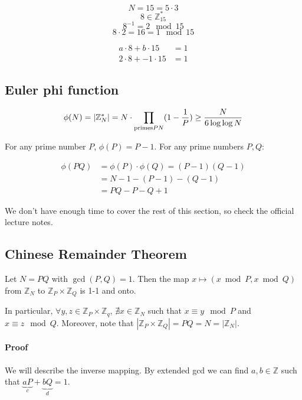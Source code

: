 \documentclass{idc_msc}
\let\divides\relax
\newcommand{\divides}[1]{{}^{#1}\vert}
\begin{document}
\[
  N = 15 = 5 \cdot 3
\]
\[
  8 \in \mathbb{Z}_{15}^*
\]
\[
  8^{-1} = 2 \mod 15
\]
\[
  8 \cdot 2 = 16 = 1 \mod 15
\]

\[
\begin{aligned}
  a \cdot 8 + b \cdot 15 &= 1 \\
  2 \cdot 8 + -1 \cdot 15 &= 1
\end{aligned}
\]

\subsection{Euler phi function}


\[
  \phi(N) = |\mathbb{Z}_N^*| = N \cdot \prod_{\text{primes} \divides{P}N} (1 - \frac{1}{P}) \ge \frac{N}{6 \log \log N}
\]

For any prime number \(P\), \(\phi(P) = P - 1\).
For any prime numbers \(P, Q\):

\[
\begin{aligned}
  \phi(PQ) &= \phi(P) \cdot \phi(Q) = (P-1)(Q-1) \\
  &= N - 1 - (P - 1) - (Q - 1) \\
  &= PQ - P - Q + 1
\end{aligned}
\]

We don't have enough time to cover the rest of this section, so check the official lecture notes.

\subsection{Chinese Remainder Theorem}

Let \(N = PQ\) with \(\gcd(P, Q) = 1\).
Then the map \(x \mapsto (x \bmod P, x \bmod Q)\) from \(\mathbb{Z}_N\) to \(\mathbb{Z}_P \times \mathbb{Z}_Q\) is 1-1 and onto.

In particular, \(\forall y, z \in \mathbb{Z}_P \times \mathbb{Z}_q\), \(\nexists x \in \mathbb{Z}_N\) such that \(x \equiv y \mod P\) and \(x \equiv z \mod Q\).
Moreover, note that \(|\mathbb{Z}_P \times \mathbb{Z}_Q| = PQ = N = |\mathbb{Z}_N|\).

\paragraph{Proof}

We will describe the inverse mapping.
By extended gcd we can find \(a, b \in \mathbb{Z}\) such that \(\underbrace{aP}_{c}+\underbrace{bQ}_{d} = 1\).
\end{document}

